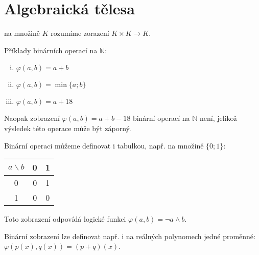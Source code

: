 \section{Algebraická tělesa}

\begin{definition}
     na množině $K$ rozumíme zorazení
    $K \times K \to K$.
\end{definition}

\begin{remark}
    Příklady binárních operací na $\mathbb{N}$:
    \begin{enumerate}[i.]
        \item $\varphi(a,b) = a + b$
        \item $\varphi(a,b) = \min\{a;b\}$
        \item $\varphi(a,b) = a+ 18$
    \end{enumerate}
    Naopak zobrazení $\varphi(a,b) = a + b - 18$ binární operací na
    $\mathbb{N}$ není, jelikož výsledek této operace může být záporný.

    Binární operaci můžeme definovat i tabulkou, např. na množině $\{0;1\}$:
    \begin{center}
        \begin{tabular}{c | c c}
            $a \backslash b$ & 0 & 1 \\
            \hline
            0 & 0 & 1 \\
            1 & 0 & 0
        \end{tabular}
    \end{center}
    Toto zobrazení odpovídá logické funkci $\varphi(a,b) = \lnot a \land b$.

    Binární zobrazení lze definovat např. i na reálných polynomech jedné
    proměnné: $\varphi(p(x), q(x)) = (p+q)(x)$.
\end{remark}

